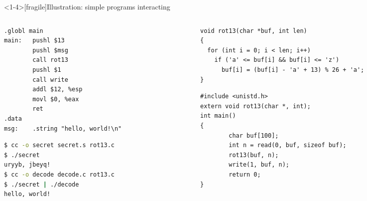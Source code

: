 \documentclass[aspectratio=1610,mathserif]{beamer}
\begin{document}
\begin{frame}<1-4>[fragile]{Illustration: simple programs interacting} %
  \begin{columns}
  \begin{column}{.41\textwidth}
  \begin{lstlisting}[title={secret.s}]
.globl main
main:   pushl $13
        pushl $msg
        call rot13
        pushl $1
        call write
        addl $12, %esp
        movl $0, %eax
        ret
.data
msg:    .string "hello, world!\n"
  \end{lstlisting}
  \vspace{1em}
  \begin{lstlisting}[language=sh]
$ cc -o secret secret.s rot13.c
$ ./secret
uryyb, jbeyq!
$ cc -o decode decode.c rot13.c
$ ./secret | ./decode
hello, world!
  \end{lstlisting}
  \end{column}
  \begin{column}{.595\textwidth}
  \begin{lstlisting}[title={rot13.c}]
void rot13(char *buf, int len)
{
  for (int i = 0; i < len; i++)
    if ('a' <= buf[i] && buf[i] <= 'z')
      buf[i] = (buf[i] - 'a' + 13) % 26 + 'a';
}
  \end{lstlisting}
  \begin{lstlisting}[title={decode.c}]
#include <unistd.h>
extern void rot13(char *, int);
int main()
{
        char buf[100];
        int n = read(0, buf, sizeof buf);
        rot13(buf, n);
        write(1, buf, n);
        return 0;
}
  \end{lstlisting}
  \end{column}
  \end{columns}
\end{frame}
\end{document}
